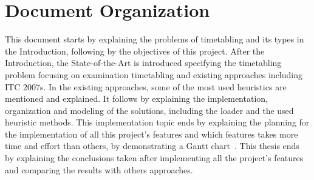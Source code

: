 \section{Document Organization}

This document starts by explaining the problems of timetabling and its types in the Introduction, following by the objectives of this project. After the Introduction, the State-of-the-Art is introduced specifying the timetabling problem focusing on examination timetabling and existing approaches including ITC 2007s. In the existing approaches, some of the most used heuristics are mentioned and explained. It follows by explaining the implementation, organization and modeling of the solutions, including the loader and the used heuristic methods. This implementation topic ends by explaining the planning for the implementation of all this project's features and which features takes more time and effort than others, by demonstrating a Gantt chart~\cite{Wilson2003}. This thesis ends by explaining the conclusions taken after implementing all the project's features and comparing the results with others approaches.